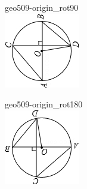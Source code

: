 \documentclass[12pt]{article}
\begin{document}
\begin{center}
\begin{minipage}{0.32\textwidth}
\end{minipage}
\hfill\begin{minipage}{0.32\textwidth}\centering
geo509-origin\_rot90\\
\includegraphics[width=0.95\linewidth]{out_rommath_origin/items/geo509-origin/assets/figure_rot90.png}
\end{minipage}
\par\medskip
\begin{minipage}{0.32\textwidth}\centering
geo509-origin\_rot180\\
\includegraphics[width=0.95\linewidth]{out_rommath_origin/items/geo509-origin/assets/figure_rot180.png}

\end{minipage}
\end{center}
\end{document}
